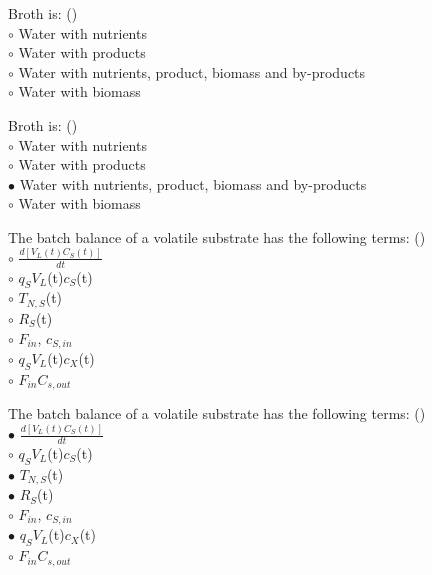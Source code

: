 \documentclass[]{beamer}
\begin{document}
\begin{frame}[shrink] {}
\addtocounter{questions}{1}
\color{blue}
Broth is: ()\\
\color{black}
\setlength{\parindent}{-0.4cm}
{\color{red}$\circ$}  Water with nutrients \\
{\color{red}$\circ$} Water with products \\
{\color{red}$\circ$}  Water with nutrients, product, biomass and by-products \\
{\color{red}$\circ$} Water with biomass  \\
\end{frame}
\begin{frame}[shrink] {}
\addtocounter{answers}{1}
\color{blue}
Broth is: ()\\
\color{black}
\setlength{\parindent}{-0.4cm}
{\color{red}$\circ$}  Water with nutrients \\
{\color{red}$\circ$} Water with products \\
{\color{red}$\bullet$}  Water with nutrients, product, biomass and by-products \\
{\color{red}$\circ$} Water with biomass  \\
\end{frame}

\begin{frame}[shrink] {}
\color{blue}

The batch balance of a volatile substrate has the following terms: ({\color{red}{Q6}})\\[0.5em]
\color{black}
\setlength{\parindent}{-0.4cm}
{\color{red}$\circ$} $\frac{d[V_L(t)C_S(t)]}{dt}$  \\
{\color{red}$\circ$} $q_{S}$$V_{L}$(t)$c_{S}$(t)  \\
{\color{red}$\circ$} $T_{N,S}$(t)  \\
{\color{red}$\circ$} $R_{S}$(t)  \\
{\color{red}$\circ$} $F_{in}$, $c_{S,in}$  \\
{\color{red}$\circ$} $q_{S}$$V_{L}$(t)$c_{X}$(t)  \\
{\color{red}$\circ$} $F_{in}$$C_{s,out}$  \\
\end{frame}
\begin{frame}[shrink] {}
\color{blue}

The batch balance of a volatile substrate has the following terms: ({\color{green}{Q6}})\\[0.5em]
\color{black}
\setlength{\parindent}{-0.4cm}
{\color{red}$\bullet$} $\frac{d[V_L(t)C_S(t)]}{dt}$  \\
{\color{red}$\circ$} $q_{S}$$V_{L}$(t)$c_{S}$(t)  \\
{\color{red}$\bullet$} $T_{N,S}$(t)  \\
{\color{red}$\bullet$} $R_{S}$(t)  \\
{\color{red}$\circ$} $F_{in}$, $c_{S,in}$  \\
{\color{red}$\bullet$} $q_{S}$$V_{L}$(t)$c_{X}$(t)  \\
{\color{red}$\circ$} $F_{in}$$C_{s,out}$  \\
\end{frame}
\end{document}
